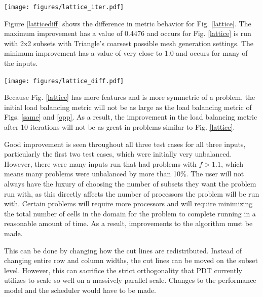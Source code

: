 \noindent\begin{minipage}{\textwidth}
\centering
\texttt{[image: figures/lattice\_iter.pdf]}
\label{latticeiter}
\end{minipage}
\smallskip

Figure \ref{latticediff} shows the difference in metric behavior for Fig. \ref{lattice}. The maximum improvement has a value of 0.4476 and occurs for Fig. \ref{lattice} is run with 2x2 subsets with Triangle's coarsest possible mesh generation settings. The minimum improvement has a value of very close to 1.0 and occurs for many of the inputs. 

\noindent\begin{minipage}{\textwidth}
\centering
\texttt{[image: figures/lattice\_diff.pdf]}
\label{latticediff}
\end{minipage}
\smallskip

Because Fig. \ref{lattice} has more features and is more symmetric of a problem, the initial load balancing metric will not be as large as the load balancing metric of Figs. \ref{same} and \ref{opp}. As a result, the improvement in the load balancing metric after 10 iterations will not be as great in problems similar to Fig. \ref{lattice}. 

Good improvement is seen throughout all three test cases for all three inputs, particularly the first two test cases, which were initially very unbalanced. However, there were many inputs run that had problems with $f > 1.1$, which means many problems were unbalanced by more than 10\%. The user will not always have the luxury of choosing the number of subsets they want the problem run with, as this directly affects the number of processors the problem will be run with. Certain problems will require more processors and will require minimizing the total number of cells in the domain for the problem to complete running in a reasonable amount of time. As a result, improvements to the algorithm must be made. 

This can be done by changing how the cut lines are redistributed. Instead of changing entire row and column widths, the cut lines can be moved on the subset level. However, this can sacrifice the strict orthogonality that PDT currently utilizes to scale so well on a massively parallel scale. Changes to the performance model and the scheduler would have to be made.

